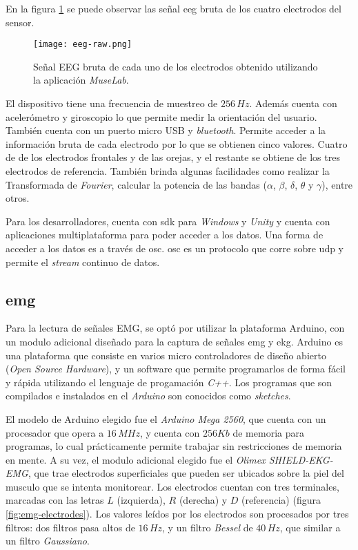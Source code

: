 En la figura \ref{fig:eeg-raw} se puede observar las señal \acrshort{eeg} bruta de los cuatro electrodos del sensor.

\begin{figure}[H]
	\centering
    \texttt{[image: eeg-raw.png]}
    \caption{Señal EEG bruta de cada uno de los electrodos obtenido utilizando la aplicación \emph{MuseLab}.}
	\label{fig:eeg-raw}
\end{figure}

El dispositivo tiene una frecuencia de muestreo de $ 256 \, Hz$. Además cuenta con acelerómetro y giroscopio lo que permite medir la orientación del usuario. También cuenta con un puerto micro USB y \emph{bluetooth}. Permite acceder a la información bruta de cada electrodo por lo que se obtienen cinco valores. Cuatro de de los electrodos frontales y de las orejas, y el restante se obtiene de los tres electrodos de referencia. También brinda algunas facilidades como realizar la Transformada de \emph{Fourier},  calcular la potencia de las bandas ($\alpha$, $\beta$, $\delta$, $\theta$ y $\gamma$), entre otros.

Para los desarrolladores, cuenta con \acrshort{sdk} para \emph{Windows} y \emph{Unity} y cuenta con aplicaciones multiplataforma para poder acceder a los datos. Una forma de acceder a los datos es a través de \gls{osc}. \acrshort{osc} es un protocolo que corre sobre \acrshort{udp} y permite el \emph{stream} continuo de datos.

\subsection{\acrshort{emg}} \label{emg-hardware}

Para la lectura de señales EMG, se optó por utilizar la plataforma Arduino, con un modulo adicional diseñado para la captura de señales \acrshort{emg} y \acrshort{ekg}.  Arduino es una plataforma que consiste en varios micro controladores de diseño abierto (\emph{Open Source Hardware}), y un software que permite programarlos de forma fácil y rápida utilizando el lenguaje de progamación \emph{C++}. Los programas que son compilados e instalados en el \emph{Arduino} son conocidos como \emph{sketches}.

El modelo de Arduino elegido fue el \emph{Arduino Mega 2560}, que cuenta con un procesador que opera a $16\, MHz$, y cuenta con $256 Kb$ de memoria para programas, lo cual prácticamente permite trabajar sin restricciones de memoria en mente. A su vez, el modulo adicional elegido fue el \emph{Olimex SHIELD-EKG-EMG}, que trae electrodos superficiales que pueden ser ubicados sobre la piel del musculo que se intenta monitorear.  Los electrodos cuentan con tres terminales, marcadas con las letras $L$ (izquierda), $R$ (derecha) y $D$ (referencia) (figura \ref{fig:emg-electrodes}). Los valores leídos por los electrodos son procesados por tres filtros: dos filtros pasa altos de $16\, Hz$, y un filtro \emph{Bessel} de $40\, Hz$, que similar a un filtro \emph{Gaussiano}.

